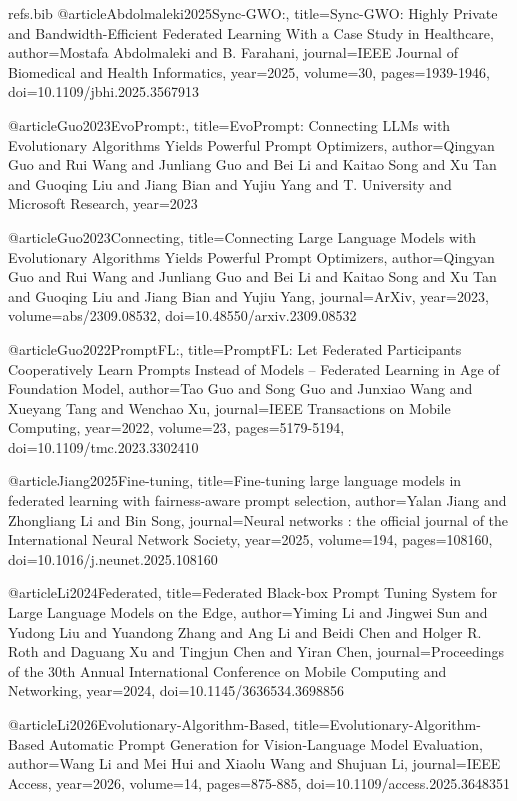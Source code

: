 \begin{filecontents}{refs.bib}
@article{Abdolmaleki2025Sync-GWO:,
title={Sync-GWO: Highly Private and Bandwidth-Efficient Federated Learning With a Case Study in Healthcare},
author={Mostafa Abdolmaleki and B. Farahani},
journal={IEEE Journal of Biomedical and Health Informatics},
year={2025},
volume={30},
pages={1939-1946},
doi={10.1109/jbhi.2025.3567913}
}

@article{Guo2023EvoPrompt:,
title={EvoPrompt: Connecting LLMs with Evolutionary Algorithms Yields Powerful Prompt Optimizers},
author={Qingyan Guo and Rui Wang and Junliang Guo and Bei Li and Kaitao Song and Xu Tan and Guoqing Liu and Jiang Bian and Yujiu Yang and T. University and Microsoft Research},
year={2023}
}

@article{Guo2023Connecting,
title={Connecting Large Language Models with Evolutionary Algorithms Yields Powerful Prompt Optimizers},
author={Qingyan Guo and Rui Wang and Junliang Guo and Bei Li and Kaitao Song and Xu Tan and Guoqing Liu and Jiang Bian and Yujiu Yang},
journal={ArXiv},
year={2023},
volume={abs/2309.08532},
doi={10.48550/arxiv.2309.08532}
}

@article{Guo2022PromptFL:,
title={PromptFL: Let Federated Participants Cooperatively Learn Prompts Instead of Models – Federated Learning in Age of Foundation Model},
author={Tao Guo and Song Guo and Junxiao Wang and Xueyang Tang and Wenchao Xu},
journal={IEEE Transactions on Mobile Computing},
year={2022},
volume={23},
pages={5179-5194},
doi={10.1109/tmc.2023.3302410}
}

@article{Jiang2025Fine-tuning,
title={Fine-tuning large language models in federated learning with fairness-aware prompt selection},
author={Yalan Jiang and Zhongliang Li and Bin Song},
journal={Neural networks : the official journal of the International Neural Network Society},
year={2025},
volume={194},
pages={108160},
doi={10.1016/j.neunet.2025.108160}
}

@article{Li2024Federated,
title={Federated Black-box Prompt Tuning System for Large Language Models on the Edge},
author={Yiming Li and Jingwei Sun and Yudong Liu and Yuandong Zhang and Ang Li and Beidi Chen and Holger R. Roth and Daguang Xu and Tingjun Chen and Yiran Chen},
journal={Proceedings of the 30th Annual International Conference on Mobile Computing and Networking},
year={2024},
doi={10.1145/3636534.3698856}
}

@article{Li2026Evolutionary-Algorithm-Based,
title={Evolutionary-Algorithm-Based Automatic Prompt Generation for Vision-Language Model Evaluation},
author={Wang Li and Mei Hui and Xiaolu Wang and Shujuan Li},
journal={IEEE Access},
year={2026},
volume={14},
pages={875-885},
doi={10.1109/access.2025.3648351}
}


\end{filecontents}
